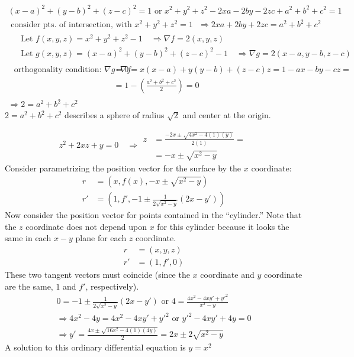 \documentclass[twoside]{amsart}
\theoremstyle{plain}
\theoremstyle{definition}
\newcommand{\exercisehead}[1]
  {
   \noindent{\small\bf Exercise #1.}
   \smallskip}
\begin{document}
\exercisehead{13} 
\[
\begin{gathered}
  (x-a)^2 + (y-b)^2 + (z-c)^2 = 1 \text{ or } x^2 + y^2 + z^2 -2xa - 2by - 2zc + a^2 + b^2 +c^2 = 1 \\
\text{ consider pts. of intersection, with $x^2 + y^2 + z^2 = 1$ } \Longrightarrow 2xa + 2by + 2zc = a^2 + b^2 + c^2 
\end{gathered}
\]
\[
\begin{gathered}
  \begin{aligned}
    & \text{ Let } f(x,y,z) = x^2 + y^2 + z^2 -1 \quad \Longrightarrow \nabla f = 2 (x,y,z) \\
    &  \text{ Let } g(x,y,z) = (x-a)^2 + (y-b)^2 + (z-c)^2 - 1 \quad \Longrightarrow \nabla g = 2(x-a,y-b,z-c)
\end{aligned} \\
\begin{aligned}
  \text{ orthogonality condition: } \nabla g \cdot \nabla f & = 0 = x(x-a) + y(y-b)+(z-c)z = 1 - ax - by - cz = \\
  & = 1 - \left( \frac{ a^2 + b^2 + c^2 }{2} \right) = 0 
\end{aligned} \\
\Longrightarrow \boxed{ 2 = a^2 + b^2 + c^2 } 
\end{gathered}
\]
$2 = a^2 + b^2 + c^2$ describes a sphere of radius $\sqrt{2}$ and center at the origin.  

\exercisehead{14} 
\[
z^2 + 2xz + y = 0 \quad \Longrightarrow \begin{aligned} z & = \frac{-2x \pm \sqrt{ 4x^2 - 4(1)(y) } }{2(1) } = \\
  & = -x \pm \sqrt{ x^2 - y } \end{aligned}
\]
Consider parametrizing the position vector for the surface by the $x$ coordinate:
\[
\begin{aligned}
  r & = (x,f(x), -x \pm \sqrt{ x^2 - y } ) \\
  r' & = (1,f', -1 \pm \frac{1}{ 2 \sqrt{ x^2 - y }} (2x- y') )
\end{aligned}
\]
Now consider the position vector for points contained in the ``cylinder.''  Note that the $z$ coordinate does not depend upon $x$ for this cylinder because it looks the same in each $x-y$ plane for each $z$ coordinate.  
\[
\begin{aligned}
  r & = (x,y,z) \\
  r' & = (1,f',0)
\end{aligned}
\]
These two tangent vectors must coincide (since the $x$ coordinate and $y$ coordinate are the same, $1$ and $f'$, respectively).  
\[
\begin{gathered}
  0 = -1 \pm \frac{1}{ 2 \sqrt{ x^2 - y }} (2x- y') \text{ or } 4 = \frac{ 4x^2 - 4xy' + y'^2 }{ x^2 - y} \\
  \Longrightarrow 4x^2 - 4y = 4x^2 - 4xy' + y'^2 \text{ or } y'^2 - 4xy' + 4y = 0 \\
  \Longrightarrow y' = \frac{ 4x \pm \sqrt{ 16x^2 - 4(1)(4y)} }{2} = 2x \pm 2 \sqrt{ x^2 - y } 
\end{gathered}
\]
A solution to this ordinary differential equation is $\boxed{ y = x^2 }$
\end{document}
